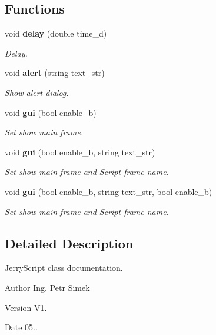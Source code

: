 \subsection*{Functions}
\begin{DoxyCompactItemize}
\item 
void \textbf{ delay} (double time\+\_\+d)
\begin{DoxyCompactList}\small\item\em Delay. \end{DoxyCompactList}\item 
void \textbf{ alert} (string text\+\_\+str)
\begin{DoxyCompactList}\small\item\em Show alert dialog. \end{DoxyCompactList}\item 
void \textbf{ gui} (bool enable\+\_\+b)
\begin{DoxyCompactList}\small\item\em Set show main frame. \end{DoxyCompactList}\item 
void \textbf{ gui} (bool enable\+\_\+b, string text\+\_\+str)
\begin{DoxyCompactList}\small\item\em Set show main frame and Script frame name. \end{DoxyCompactList}\item 
void \textbf{ gui} (bool enable\+\_\+b, string text\+\_\+str, bool enable\+\_\+b)
\begin{DoxyCompactList}\small\item\em Set show main frame and Script frame name. \end{DoxyCompactList}\end{DoxyCompactItemize}


\subsection{Detailed Description}
Jerry\+Script class documentation. 

\begin{DoxyAuthor}{Author}
Ing. Petr Simek 
\end{DoxyAuthor}
\begin{DoxyVersion}{Version}
V1. 
\end{DoxyVersion}
\begin{DoxyDate}{Date}
05.. 
\end{DoxyDate}
